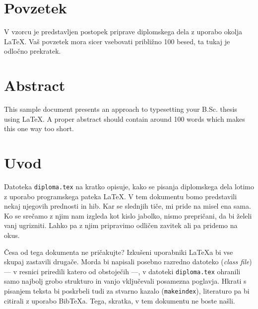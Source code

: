 \documentclass[a4paper, 12pt]{book}
\newcommand{\BibTeX}{{\sc Bib}\TeX}
\newcommand{\clearemptydoublepage}{\newpage{\pagestyle{empty}\cleardoublepage}}
\begin{document}
\def\thepage{}%
\tableofcontents{}


\clearemptydoublepage

\chapter*{Povzetek}
V vzorcu je predstavljen postopek priprave diplomskega dela z uporabo okolja \LaTeX. Vaš povzetek mora sicer vsebovati približno 100 besed, ta tukaj je odločno prekratek.
\clearemptydoublepage

\chapter*{Abstract}
This sample document presents an approach to typesetting your B.Sc. thesis using \LaTeX. A proper abstract should contain around 100 words which makes this one way too short.
\clearemptydoublepage

\mainmatter
\setcounter{page}{1}
\pagestyle{fancy}

\chapter{Uvod}
Datoteka {\tt diploma.tex} na kratko opisuje, kako se pisanja diplomskega dela lotimo z uporabo programskega pateka \LaTeX. V tem dokumentu bomo predstavili nekaj njegovih prednosti in hib. Kar se slednjih tiče, mi pride na misel ena sama. Ko se srečamo z njim nam izgleda kot kislo jabolko, nismo prepričani, da bi želeli vanj ugrizniti. Lahko pa z njim pripravimo odličen zavitek ali pa pridemo na okus.

Česa od tega dokumenta ne pričakujte? Izkušeni uporabniki \LaTeX{}a bi vse skupaj zastavili 
drugače. Morda bi napisali posebno razredno datoteko (\emph{class file}) --- v resnici priredili katero od obstoječih ---, v datoteki {\tt diploma.tex} ohranili samo najbolj grobo strukturo in vanjo vključevali  posamezna po\-glav\-ja. Hkrati s pisanjem teksta bi poskrbeli tudi za stvarno kazalo ({\tt makeindex}), literaturo pa bi citirali z uporabo {\BibTeX}{a}. Tega, skratka, v tem dokumentu ne boste našli.
\end{document}
